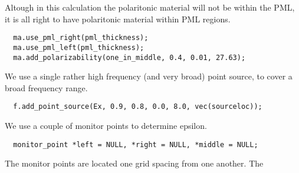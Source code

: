 \begin{comment}
const double a = 10;
const double pml_thickness = 160.0/a;
const double middlesize = 5.0/a;
const double zsize = middlesize + 2*pml_thickness;
\end{verbatim}

For our example polaritonic material, we'll use an $\epsilon(0)$ of 13.4.

\begin{verbatim}
double eps(const vec &) { return 13.4; }
\end{verbatim}
\begin{comment}
double one_in_middle(const vec &p) {
  if (p.z() > pml_thickness && p.z() <= pml_thickness + middlesize) return 1;
  else return 0;
}

int main(int argc, char **argv) {
  deal_with_ctrl_c();
  const double ttot =1180.0;
  mat_chunk ma(volone(zsize, a), eps);
  const char *dirname = make_output_directory(argv[0]);
  printf("Storing output in directory %
  ma.set_output_directory(dirname);
\end{comment}
Altough in this calculation the polaritonic material will not be within the
PML, it is all right to have polaritonic material within PML regions.
\begin{verbatim}
  ma.use_pml_right(pml_thickness);
  ma.use_pml_left(pml_thickness);
  ma.add_polarizability(one_in_middle, 0.4, 0.01, 27.63);
\end{verbatim}
\begin{comment}
  fields_chunk f(&ma);
  double sourceloc = pml_thickness+1.0/(double)a;
\end{comment}
We use a single rather high frequency (and very broad) point source, to
cover a broad frequency range.
\begin{verbatim}
  f.add_point_source(Ex, 0.9, 0.8, 0.0, 8.0, vec(sourceloc));
\end{verbatim}
We use a couple of monitor points to determine epsilon.
\begin{verbatim}
  monitor_point *left = NULL, *right = NULL, *middle = NULL;
\end{verbatim}
\begin{comment}
  double next_printtime = 50;
  while (f.time() < ttot && !interrupt) {
    if (f.time() >= next_printtime) {
      next_printtime += 50;
      printf("Working on time %
      printf("energy is %
    }
\end{comment}
The monitor points are located one grid spacing from one another.  The
